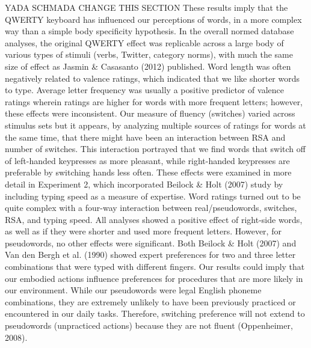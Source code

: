 \documentclass[english,man]{apa6}
\theoremstyle{definition}
\theoremstyle{definition}
\theoremstyle{definition}
\theoremstyle{remark}
\begin{document}
YADA SCHMADA CHANGE THIS SECTION These results imply that the QWERTY
keyboard has influenced our perceptions of words, in a more complex way
than a simple body specificity hypothesis. In the overall normed
database analyses, the original QWERTY effect was replicable across a
large body of various types of stimuli (verbs, Twitter, category norms),
with much the same size of effect as Jasmin \& Casasanto (2012)
published. Word length was often negatively related to valence ratings,
which indicated that we like shorter words to type. Average letter
frequency was usually a positive predictor of valence ratings wherein
ratings are higher for words with more frequent letters; however, these
effects were inconsistent. Our measure of fluency (switches) varied
across stimulus sets but it appears, by analyzing multiple sources of
ratings for words at the same time, that there might have been an
interaction between RSA and number of switches. This interaction
portrayed that we find words that switch off of left-handed keypresses
as more pleasant, while right-handed keypresses are preferable by
switching hands less often. These effects were examined in more detail
in Experiment 2, which incorporated Beilock \& Holt (2007) study by
including typing speed as a measure of expertise. Word ratings turned
out to be quite complex with a four-way interaction between
real/pseudowords, switches, RSA, and typing speed. All analyses showed a
positive effect of right-side words, as well as if they were shorter and
used more frequent letters. However, for pseudowords, no other effects
were significant. Both Beilock \& Holt (2007) and Van den Bergh et al.
(1990) showed expert preferences for two and three letter combinations
that were typed with different fingers. Our results could imply that our
embodied actions influence preferences for procedures that are more
likely in our environment. While our pseudowords were legal English
phoneme combinations, they are extremely unlikely to have been
previously practiced or encountered in our daily tasks. Therefore,
switching preference will not extend to pseudowords (unpracticed
actions) because they are not fluent (Oppenheimer, 2008).
\end{document}
